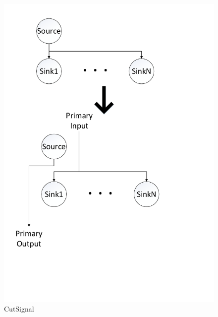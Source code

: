 \documentclass[12pt,final,oneside]{dwThesis} %
\begin{document}
   \begin{figure}

      \begin{center}

         \includegraphics[width=\linewidth]{images/CutSignal.pdf}
         \caption{CutSignal} \label{imCutSignal} 
      \end{center}

   \end{figure}
\end{document}
